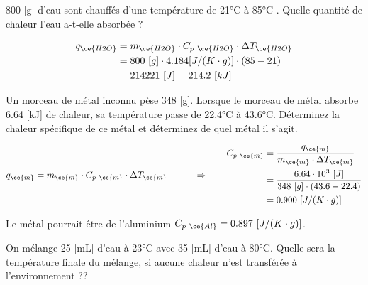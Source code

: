 \documentclass[
  11pt,
  a4paper,
  openany]{book}
\begin{document}
\begin{Exercise}

800 {[}g{]} d'eau sont chauffés d'une température de 21°C à 85°C . Quelle quantité de chaleur l'eau a-t-elle absorbée ?


\end{Exercise}

\begin{Answer}
\[
\begin{split}
q_{\ce{H2O}} &= m_{\ce{H2O}} \cdot C_{p\ \ce{H2O}} \cdot \Delta T_{\ce{H2O}} \\
 &= 800\ [g] \cdot 4.184 [J/(K \cdot g)] \cdot (85-21) \\
 &= 214221\ [J] =  214.2\ [kJ]
\end{split}
\]

\end{Answer}

\clearpage

\begin{Exercise}

Un morceau de métal inconnu pèse 348 {[}g{]}. Lorsque le morceau de métal absorbe 6.64 {[}kJ{]} de chaleur, sa température passe de 22.4°C à 43.6°C. Déterminez la chaleur spécifique de ce métal et déterminez de quel métal il s'agit.


\end{Exercise}

\begin{Answer}
\[
\begin{split}
q_{\ce{m}} &= m_{\ce{m}} \cdot C_{p\ \ce{m}} \cdot \Delta T_{\ce{m}}
\end{split}
\qquad \Rightarrow \qquad
\begin{split}
C_{p\ \ce{m}} &= \frac{q_{\ce{m}}}{m_{\ce{m}} \cdot \Delta T_{\ce{m}}} \\
 &= \frac{6.64 \cdot 10^3\ [J]}{348\ [g] \cdot (43.6 - 22.4)} \\
 &= 0.900\ [J/(K \cdot g)] \\
\end{split}
\]

Le métal pourrait être de l'aluminium \(C_{p\ \ce{Al}} = 0.897\ [J/(K \cdot g)]\).

\end{Answer}

\begin{Exercise}

On mélange 25 {[}mL{]} d'eau à 23°C avec 35 {[}mL{]} d'eau à 80°C. Quelle sera la température finale du mélange, si aucune chaleur n'est transférée à l'environnement ??


\end{Exercise}
\end{document}
